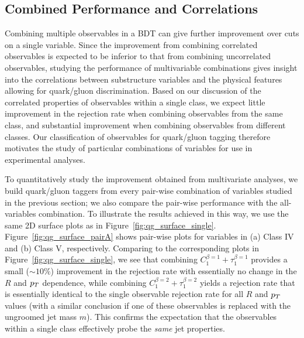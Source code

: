 \subsection{Combined Performance and Correlations}\label{sec:qg_combi}
Combining multiple observables in a BDT can give further improvement over cuts on a single variable. Since the improvement from combining correlated observables is expected to be inferior to that from combining uncorrelated observables, studying the performance of multivariable combinations gives insight into the correlations between substructure variables and the physical  
features allowing for quark/gluon discrimination. Based on our discussion of the correlated properties
of observables within a single class, we expect little improvement in the rejection rate when combining observables from the same class,
and substantial improvement when combining observables from different classes.  Our classification of observables for quark/gluon tagging  therefore motivates the study of
particular combinations of variables for use in experimental analyses.
 
 To quantitatively study the improvement obtained from multivariate analyses, we build quark/gluon taggers from
every pair-wise combination of variables studied in the previous section; we also compare the pair-wise performance with the all-variables combination.
  To illustrate the results achieved in this way, we use the same  2D 
surface plots as in Figure~\ref{fig:qg_surface_single}.  
Figure~\ref{fig:qg_surface_pairA} shows pair-wise plots for variables in (a) Class IV and (b) Class V, respectively.  Comparing to the corresponding plots
in Figure~\ref{fig:qg_surface_single}, we see that combining $C_1^{\beta=1}+\tau_{1}^{\beta=1}$ provides a 
small ($\sim10\%$) improvement in the rejection rate  with essentially no change in the $R$ and $p_T$ dependence, while combining $C_1^{\beta=2}+\tau_{1}^{\beta=2}$   
yields a rejection rate that is essentially identical to the single observable rejection rate for all $R$ and $p_T$ values (with a similar conclusion if one
of these observables is replaced with the ungroomed jet mass $m$).  
This  confirms the expectation that the
observables within a single class effectively probe the \textit{same} jet properties.

